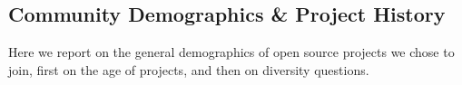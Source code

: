 \subsection{Community Demographics \& Project History}

Here we report on the general demographics of open source projects we chose to join, first on the age of projects, and then on diversity questions. 


